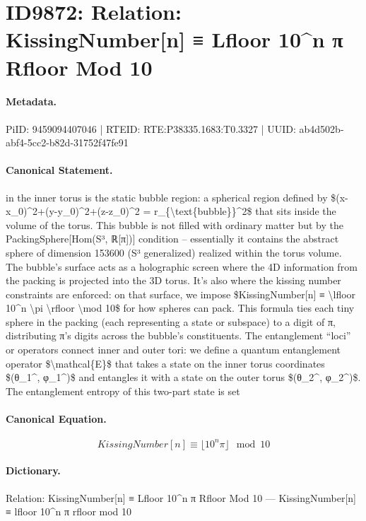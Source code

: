\section*{ID9872: Relation: KissingNumber[n] ≡ Lfloor 10\textasciicircum{}n π Rfloor Mod 10}
\paragraph{Metadata.}
PiID: 9459094407046 | RTEID: RTE:P38335.1683:T0.3327 | UUID: ab4d502b-abf4-5cc2-b82d-31752f47fe91

\paragraph{Canonical Statement.}
in the inner torus is the static bubble region: a spherical region defined by \$(x-x\_0)\textasciicircum{}2+(y-y\_0)\textasciicircum{}2+(z-z\_0)\textasciicircum{}2 = r\_\{\textbackslash{}text\{bubble\}\}\textasciicircum{}2\$ that sits inside the volume of the torus. This bubble is not filled with ordinary matter but by the PackingSphere[Hom(S³, ℝ[π])] condition – essentially it contains the abstract sphere of dimension 153600 (S³ generalized) realized within the torus volume. The bubble’s surface acts as a holographic screen where the 4D information from the packing is projected into the 3D torus. It’s also where the kissing number constraints are enforced: on that surface, we impose \$KissingNumber[n] ≡ \textbackslash{}lfloor 10\textasciicircum{}n \textbackslash{}pi \textbackslash{}rfloor \textbackslash{}mod 10\$ for how spheres can pack. This formula ties each tiny sphere in the packing (each representing a state or subspace) to a digit of π, distributing π’s digits across the bubble’s constituents. The entanglement “loci” or operators connect inner and outer tori: we define a quantum entanglement operator \$\textbackslash{}mathcal\{E\}\$ that takes a state on the inner torus coordinates \$(θ\_1\textasciicircum{}, φ\_1\textasciicircum{})\$ and entangles it with a state on the outer torus \$(θ\_2\textasciicircum{}, φ\_2\textasciicircum{})\$. The entanglement entropy of this two-part state is set

\paragraph{Canonical Equation.}
\[
KissingNumber[n] ≡ \lfloor 10^n \pi \rfloor \mod 10
\]

\paragraph{Dictionary.}
Relation: KissingNumber[n] ≡ Lfloor 10\textasciicircum{}n π Rfloor Mod 10 — KissingNumber[n] ≡ lfloor 10\textasciicircum{}n π rfloor mod 10

